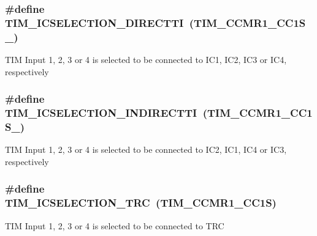 \subsubsection[{\texorpdfstring{T\+I\+M\+\_\+\+I\+C\+S\+E\+L\+E\+C\+T\+I\+O\+N\+\_\+\+D\+I\+R\+E\+C\+T\+TI}{TIM_ICSELECTION_DIRECTTI}}]{\setlength{\rightskip}{0pt plus 5cm}\#define T\+I\+M\+\_\+\+I\+C\+S\+E\+L\+E\+C\+T\+I\+O\+N\+\_\+\+D\+I\+R\+E\+C\+T\+TI~({\bf T\+I\+M\+\_\+\+C\+C\+M\+R1\+\_\+\+C\+C1\+S\+\_})}\hypertarget{group___t_i_m___input___capture___selection_gac3be2fd9c576e84e0ebcfc7b3c0773a3}{}\label{group___t_i_m___input___capture___selection_gac3be2fd9c576e84e0ebcfc7b3c0773a3}
T\+IM Input 1, 2, 3 or 4 is selected to be connected to I\+C1, I\+C2, I\+C3 or I\+C4, respectively 
\subsubsection[{\texorpdfstring{T\+I\+M\+\_\+\+I\+C\+S\+E\+L\+E\+C\+T\+I\+O\+N\+\_\+\+I\+N\+D\+I\+R\+E\+C\+T\+TI}{TIM_ICSELECTION_INDIRECTTI}}]{\setlength{\rightskip}{0pt plus 5cm}\#define T\+I\+M\+\_\+\+I\+C\+S\+E\+L\+E\+C\+T\+I\+O\+N\+\_\+\+I\+N\+D\+I\+R\+E\+C\+T\+TI~({\bf T\+I\+M\+\_\+\+C\+C\+M\+R1\+\_\+\+C\+C1\+S\+\_})}\hypertarget{group___t_i_m___input___capture___selection_gab9754d4318abcd7fe725e3ee2e4496d4}{}\label{group___t_i_m___input___capture___selection_gab9754d4318abcd7fe725e3ee2e4496d4}
T\+IM Input 1, 2, 3 or 4 is selected to be connected to I\+C2, I\+C1, I\+C4 or I\+C3, respectively 
\subsubsection[{\texorpdfstring{T\+I\+M\+\_\+\+I\+C\+S\+E\+L\+E\+C\+T\+I\+O\+N\+\_\+\+T\+RC}{TIM_ICSELECTION_TRC}}]{\setlength{\rightskip}{0pt plus 5cm}\#define T\+I\+M\+\_\+\+I\+C\+S\+E\+L\+E\+C\+T\+I\+O\+N\+\_\+\+T\+RC~({\bf T\+I\+M\+\_\+\+C\+C\+M\+R1\+\_\+\+C\+C1S})}\hypertarget{group___t_i_m___input___capture___selection_ga9e0191bbf1a82dd9150b9283c39276e7}{}\label{group___t_i_m___input___capture___selection_ga9e0191bbf1a82dd9150b9283c39276e7}
T\+IM Input 1, 2, 3 or 4 is selected to be connected to T\+RC 